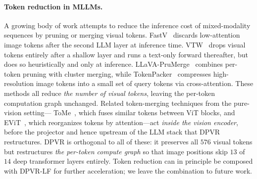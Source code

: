 \documentclass[a4paper,fleqn,review]{cas-sc}
\newcommand{\dpvr}{DPVR}
\newcommand{\dpvrlf}{DPVR-LF}
\begin{document}
\paragraph{Token reduction in MLLMs.}
A growing body of work attempts to reduce the inference cost of
mixed-modality sequences by pruning or merging visual tokens.
FastV~\citep{cai2024fastv} discards low-attention image tokens after
the second LLM layer at inference time. VTW~\citep{lin2024vtw} drops
visual tokens entirely after a shallow layer and runs a text-only
forward thereafter, but does so heuristically and only at inference.
LLaVA-PruMerge~\citep{shang2024prumerge} combines per-token pruning
with cluster merging, while TokenPacker~\citep{li2024tokenpacker}
compresses high-resolution image tokens into a small set of query
tokens via cross-attention. These methods all reduce \emph{the number
of visual tokens}, leaving the per-token computation graph unchanged.
Related token-merging techniques from the pure-vision setting---%
ToMe~\citep{bolya2023tome}, which fuses similar tokens between ViT
blocks, and EViT~\citep{liang2022evit}, which reorganizes tokens by
attention---act \emph{inside the vision encoder}, before the
projector and hence upstream of the LLM stack that \dpvr{} restructures.
\dpvr{} is orthogonal to all of these: it preserves all $576$ visual tokens but
restructures \emph{the per-token compute graph} so that image
positions skip $13$ of $14$ deep transformer layers entirely. Token
reduction can in principle be composed with \dpvrlf{} for further
acceleration; we leave the combination to future work.
\end{document}

